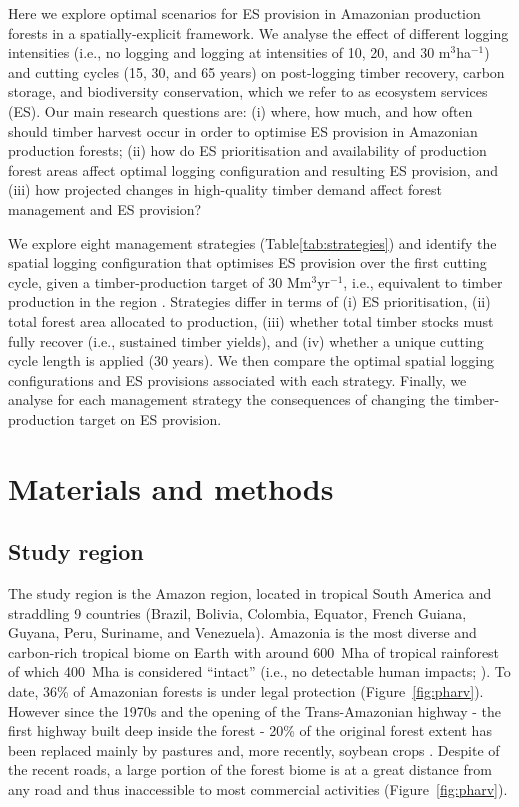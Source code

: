 \documentclass{article}
\begin{document}
Here we explore optimal scenarios for ES provision in Amazonian production forests in a spatially-explicit framework. We analyse the effect of different logging intensities (i.e., no logging and logging at intensities of 10, 20, and 30 m$^3$ha$^{-1}$) and cutting cycles (15, 30, and 65 years) on post-logging timber recovery, carbon storage, and biodiversity conservation, which we refer to as ecosystem services (ES). Our main research questions are: (i) where, how much, and how often should timber harvest occur in order to optimise ES provision in Amazonian production forests; (ii) how do ES prioritisation and availability of production forest areas affect optimal logging configuration and resulting ES provision, and (iii) how projected changes in high-quality timber demand affect forest management and ES provision? 

We explore eight management strategies (Table\ref{tab:strategies}) and identify the spatial logging configuration that optimises ES provision over the first cutting cycle, given a timber-production target of 30 Mm$^3$yr$^{-1}$, i.e., equivalent to timber production in the region \cite{Lentini2005}. Strategies differ in terms of (i) ES prioritisation, (ii) total forest area allocated to production, (iii) whether total timber stocks must fully recover (i.e., sustained timber yields), and (iv) whether a unique cutting cycle length is applied (30 years). We then compare the optimal spatial logging configurations and ES provisions associated with each strategy. Finally, we analyse for each management strategy the consequences of changing the timber-production target on ES provision.

\section{Materials and methods}

\subsection{Study region}

The study region is the Amazon region, located in tropical South America and straddling 9 countries (Brazil, Bolivia, Colombia, Equator, French Guiana, Guyana, Peru, Suriname, and Venezuela). Amazonia is the most diverse and carbon-rich tropical biome on Earth \cite{Avitabile2016,Pimm2014} with around 600~Mha of tropical rainforest of which 400~Mha is considered “intact” (i.e., no detectable human impacts; \cite{Potapov2017}). To date, 36\% of Amazonian forests is under legal protection \cite{WDPA2016} (Figure~\ref{fig:pharv}). However since the 1970s and the opening of the Trans-Amazonian highway - the first highway built deep inside the forest - 20\% of the original forest extent has been replaced mainly by pastures and, more recently, soybean crops \cite{INPE2018,Fearnside2017}. Despite of the recent roads, a large portion of the forest biome is at a great distance from any road and thus inaccessible to most commercial activities (Figure~\ref{fig:pharv}).
\end{document}
